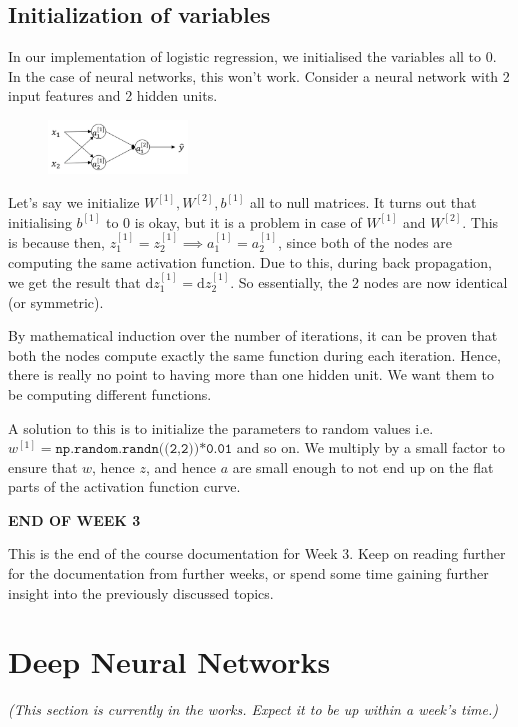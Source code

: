 \documentclass{article}[a4paper,12pt]
\theoremstyle{definition}
\begin{document}
\subsection{Initialization of variables}
In our implementation of logistic regression, we initialised the variables all to 0. In the case of neural networks, this won't work. Consider a neural network with 2 input features and 2 hidden units.
\begin{figure}
\centering \includegraphics[width=0.33\textwidth]{initialization.png}
\end{figure}
\vspace{6pt}

Let's say we initialize $W^{[1]},W^{[2]},b^{[1]}$ all to null matrices. It turns out that initialising $b^{[1]}$ to 0 is okay, but it is a problem in case of $W^{[1]}$ and $W^{[2]}$. This is because then, $z_1^{[1]}=z_2^{[1]}\implies a_1^{[1]}=a_2^{[1]}$, since both of the nodes are computing the same activation function. Due to this, during back propagation, we get the result that $\text{d}z_1^{[1]}=\text{d}z_2^{[1]}$. So essentially, the 2 nodes are now identical (or symmetric).
\vspace{6pt}

By mathematical induction over the number of iterations, it can be proven that both the nodes compute exactly the same function during each iteration. Hence, there is really no point to having more than one hidden unit. We want them to be computing different functions.
\vspace{6pt}

A solution to this is to initialize the parameters to random values i.e. $w^{[1]}=\texttt{np.random.randn((2,2))*0.01}$ and so on. We multiply by a small factor to ensure that $w$, hence $z$, and hence $a$ are small enough to not end up on the flat parts of the activation function curve.

\hrulefill
\begin{center}\textbf{END OF WEEK 3}\end{center}
This is the end of the course documentation for Week 3. Keep on reading further for the documentation from further weeks, or spend some time gaining further insight into the previously discussed topics.

\hrulefill
\pagebreak
\section{Deep Neural Networks}
\textit{(This section is currently in the works. Expect it to be up within a week's time.)}

\hrulefill
\end{document}
